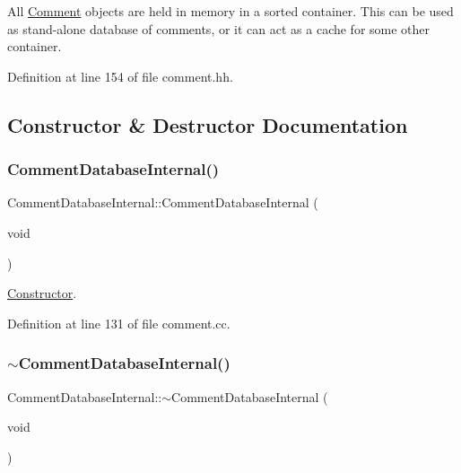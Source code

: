 All \mbox{\hyperlink{class_comment}{Comment}} objects are held in memory in a sorted container. This can be used as stand-\/alone database of comments, or it can act as a cache for some other container. 

Definition at line 154 of file comment.\+hh.



\subsection{Constructor \& Destructor Documentation}
\mbox{\label{class_comment_database_internal_a3a466e50a8124004effddd14e4e71eb4}} 
\subsubsection{\texorpdfstring{CommentDatabaseInternal()}{CommentDatabaseInternal()}}
{\footnotesize\ttfamily Comment\+Database\+Internal\+::\+Comment\+Database\+Internal (\begin{DoxyParamCaption}\item[{void}]{ }\end{DoxyParamCaption})}



\mbox{\hyperlink{class_constructor}{Constructor}}. 



Definition at line 131 of file comment.\+cc.

\mbox{\label{class_comment_database_internal_a03fa48fbd6fdea999bfa5f1a508c9b25}} 
\subsubsection{\texorpdfstring{$\sim$CommentDatabaseInternal()}{~CommentDatabaseInternal()}}
{\footnotesize\ttfamily Comment\+Database\+Internal\+::$\sim$\+Comment\+Database\+Internal (\begin{DoxyParamCaption}\item[{void}]{ }\end{DoxyParamCaption})\hspace{0.3cm}{\ttfamily [virtual]}}



